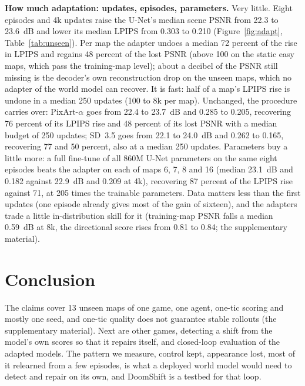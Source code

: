 \documentclass{article}
\newif\ifdraftmarks \draftmarksfalse
\newif\ifwithappendix \withappendixfalse %
\newcommand{\appref}[1]{\ifwithappendix Appendix~\ref{#1}\else the supplementary material\fi}
\newcommand{\tbd}{\ifdraftmarks\textcolor[rgb]{0,0.3,0.75}{[tbd]}\else[tbd]\fi}
\begin{document}
\textbf{How much adaptation: updates, episodes, parameters.} Very little. Eight episodes and 4k updates raise the U-Net's median scene PSNR from 22.3 to 23.6~dB and lower its median LPIPS from 0.303 to 0.210 (Figure~\ref{fig:adapt}, Table~\ref{tab:unseen}). Per map the adapter undoes a median 72 percent of the rise in LPIPS and regains 48 percent of the lost PSNR (above 100 on the static easy maps, which pass the training-map level); about a decibel of the PSNR still missing is the decoder's own reconstruction drop on the unseen maps, which no adapter of the world model can recover. It is fast: half of a map's LPIPS rise is undone in a median 250 updates (100 to 8k per map). Unchanged, the procedure carries over: PixArt-$\alpha$ goes from 22.4 to 23.7~dB and 0.285 to 0.205, recovering 76 percent of its LPIPS rise and 48 percent of its lost PSNR with a median budget of 250 updates; SD~3.5 goes from 22.1 to 24.0~dB and 0.262 to 0.165, recovering 77 and 50 percent, also at a median 250 updates. Parameters buy a little more: a full fine-tune of all 860M U-Net parameters on the same eight episodes beats the adapter on each of maps 6, 7, 8 and 16 (median 23.1~dB and 0.182 against 22.9~dB and 0.209 at 4k), recovering 87 percent of the LPIPS rise against 71, at 205 times the trainable parameters. Data matters less than the first updates (one episode already gives most of the gain of sixteen), and the adapters trade a little in-distribution skill for it (training-map PSNR falls a median 0.59~dB at 8k, the directional score rises from 0.81 to 0.84; \appref{app:perarena-adapt}).



\section{Conclusion}
\label{sec:limits}

The claims cover 13 unseen maps of one game, one agent, one-tic scoring and mostly one seed, and one-tic quality does not guarantee stable rollouts (\appref{app:closedloop}).
Next are other games, detecting a shift from the model's own scores so that it repairs itself, and closed-loop evaluation of the adapted models.
The pattern we measure, control kept, appearance lost, most of it relearned from a few episodes, is what a deployed world model would need to detect and repair on its own, and DoomShift is a testbed for that loop.
\label{body-end}


\clearpage
\acknowledgments{\tbd}

{\sloppy}

\ifwithappendix
\clearpage
\appendix

\fi
\end{document}

